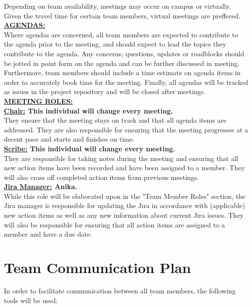 \documentclass{article}
\begin{document}
Depending on team availability, meetings may occur on campus or virtually. 
Given the travel time for certain team members, virtual meetings are preffered.\\

\noindent \textbf{\underline{AGENDAS:}} \\

Where agendas are concerned, all team members are expected to contribute to the agenda prior to the meeting, and should expect to lead the topics they contribute to the agenda. 
Any concerns, questions, updates or roadblocks should be jotted in point form on the agenda and can be further discussed in meeting. 
Furthermore, team members should include a time estimate on agenda items in order to accurately book time for the meeting.
Finally, all agendas will be tracked as issues in the project repository and will be closed after meetings. \\

\noindent \textbf{\underline{MEETING ROLES:}} \\

\noindent \textbf{\underline{Chair:} This individual will change every meeting. } \\
\noindent They ensure that the meeting stays on track and that all agenda items are addressed. 
They are also responsible for ensuring that the meeting progresses at a decent pace and starts and finishes on time. \\

\noindent \textbf{\underline{Scribe:} This individual will change every meeting.} \\
\noindent They are responsible for taking notes during the meeting and ensuring that all new action items have been recorded and have been assigned to a member.
They will also cross off completed action items from previous meetings.\\

\noindent \textbf{\underline{Jira Manager:} Anika.} \\
\noindent While this role will be elaborated upon in the "Team Member Roles" section, the Jira manager is responsible for updating the Jira in accordance with (applicable) new action items as well as any new information about current Jira issues.
They will also be responsible for ensuring that all action items are assigned to a member and have a due date.\\



\section{Team Communication Plan}
In order to facilitate communication between all team members, the following tools will be used:
\end{document}
